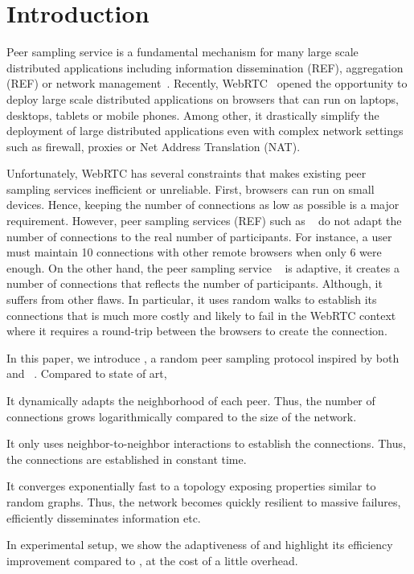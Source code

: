 
\section{Introduction}

Peer sampling service is a fundamental mechanism for many large scale
distributed applications including information dissemination (REF), aggregation
(REF) or network management~\cite{jelasity2007gossip}. Recently,
WebRTC~\cite{webrtc} opened the opportunity to deploy large scale distributed
applications on browsers that can run on laptops, desktops, tablets or mobile
phones. Among other, it drastically simplify the deployment of large
distributed applications even with complex network settings such as firewall,
proxies or Net Address Translation (NAT).

Unfortunately, WebRTC has several constraints that makes existing peer sampling
services inefficient or unreliable. First, browsers can run on small
devices. Hence, keeping the number of connections as low as possible is a major
requirement. However, peer sampling services (REF) such as \CYCLON{}~\cite{
  voulgaris2005cyclon} do not adapt the number of connections to the real
number of participants. For instance, a user must maintain 10 connections with
other remote browsers when only 6 were enough. On the other hand, the peer
sampling service \SCAMP{}~\cite{ganesh2003peer} is adaptive, it creates a
number of connections that reflects the number of participants. Although, it
suffers from other flaws. In particular, it uses random walks to establish its
connections that is much more costly and likely to fail in the WebRTC context
where it requires a round-trip between the browsers to create the connection.

In this paper, we introduce \SCAMPLON{}, a random peer sampling protocol
inspired by both \SCAMP{}~\cite{ganesh2003peer} and
\CYCLON{}~\cite{voulgaris2005cyclon}. Compared to state of art,
\begin{inparaenum}[(i)]
\item It dynamically adapts the neighborhood of each peer. Thus, the number of
  connections grows logarithmically compared to the size of the network.
\item It only uses neighbor-to-neighbor interactions to establish the
  connections. Thus, the connections are established in constant time.
\item It converges exponentially fast to a topology exposing properties similar
  to random graphs. Thus, the network becomes quickly resilient to massive
  failures, efficiently disseminates information etc.
\item In experimental setup, we show the adaptiveness of \SCAMPLON{} and
  highlight its efficiency improvement compared to \CYCLON{}, at the cost of a
  little overhead.
\end{inparaenum}

